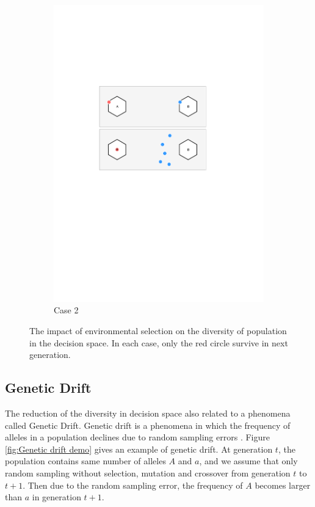 \documentclass[conference]{IEEEtran}
\begin{document}
\begin{figure}[htbp]
\begin{subfigure}[b]{.3\textwidth}
		\includegraphics[width=\linewidth]{Section3/case2}
		\caption{Case 2}
	\end{subfigure}
	\caption{The impact of environmental selection on the diversity of population in the decision space. In each case, only the red circle survive in next generation.}
	\label{fig: Environmental selection}
\end{figure}


\subsection{Genetic Drift}
The reduction of the diversity in decision space also related to a phenomena called Genetic Drift. Genetic drift is a phenomena in which the frequency of alleles in a population declines due to random sampling errors \cite{GeneticDrift}. Figure  \ref{fig:Genetic drift demo} gives an example of genetic drift. At generation $t$, the population contains same number of alleles $A$ and $a$, and we assume that only random sampling without selection, mutation and crossover from generation $t$ to $t+1$. Then due to the random sampling error, the frequency of $A$ becomes larger than $a$ in generation $t+1$. 
\end{document}
